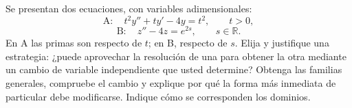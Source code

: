 Se presentan dos ecuaciones, con variables adimensionales:
\[
\mathrm A:\quad t^2y''+t y'-4y=t^2,\qquad t>0,
\]
\[
\mathrm B:\quad z''-4z=e^{2s},\qquad s\in\mathbb R.
\]
En A las primas son respecto de \(t\); en B, respecto de \(s\). Elija y justifique una estrategia: ¿puede aprovechar la resolución de una para obtener la otra mediante un cambio de variable independiente que usted determine? Obtenga las familias generales, compruebe el cambio y explique por qué la forma más inmediata de particular debe modificarse. Indique cómo se corresponden los dominios.
